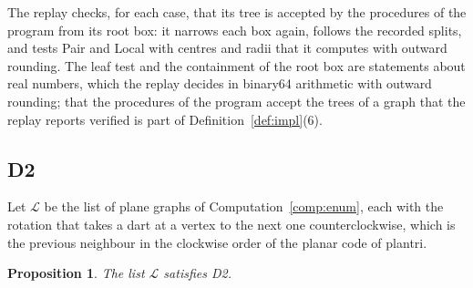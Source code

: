 \documentclass[12pt]{amsart}
\newtheorem{proposition}[theorem]{Proposition}
\theoremstyle{definition}
\theoremstyle{plain}
\theoremstyle{definition}
\newcommand{\codemap}[1]{\ignorespaces}
\newcommand{\mapnote}[1]{\ignorespaces}
\begin{document}
The replay checks, for each case, that its tree is accepted by the procedures of the program from its root box: it narrows each box again, follows the recorded splits, and tests Pair and Local with centres and radii that it computes with outward rounding. The leaf test and the containment of the root box are statements about real numbers, which the replay decides in binary64 arithmetic with outward rounding; that the procedures of the program accept the trees of a graph that the replay reports verified is part of Definition~\ref{def:impl}(6).

\subsection{D2}\label{sec:dtwoproof}
Let $\mathcal L$ be the list of plane graphs of Computation~\ref{comp:enum}, each with the rotation that takes a dart at a vertex to the next one counterclockwise, which is the previous neighbour in the clockwise order of the planar code of plantri.

\begin{proposition}\label{prop:dtwo}\mapnote{not formalized; D2 is a hypothesis of Theorems \ref{thm:formal} and \ref{thm:trees}}\codemap{code/impl1/stageA_check.sh > code/impl1/out/stageA_parts.txt}
The list $\mathcal L$ satisfies D2.
\end{proposition}
\end{document}
